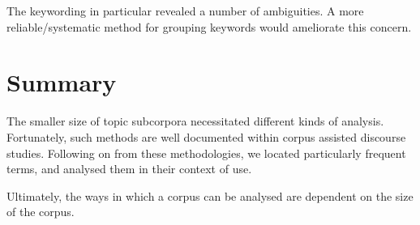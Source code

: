 The keywording in particular revealed a number of ambiguities. A more reliable\slash systematic method for grouping keywords would ameliorate this concern.

\section{Summary}

    The smaller size of topic subcorpora necessitated different kinds of analysis. Fortunately, such methods are well documented within corpus assisted discourse studies. Following on from these methodologies, we located particularly frequent terms, and analysed them in their context of use.


    Ultimately, the ways in which a corpus can be analysed are dependent on the size of the corpus. 



